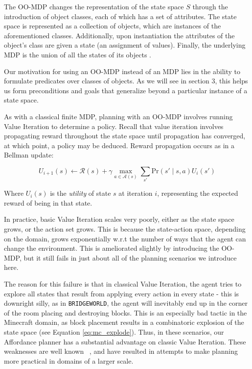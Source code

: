 \documentclass[]{article}
\begin{document}
The OO-MDP changes the representation of the state space 
$S$ through the introduction of object classes, each of which 
has a set of attributes. The state space is represented as a 
collection of objects, which are instances of the aforementioned 
classes. Additionally, upon instantiation the attributes of the 
object's class are given a state (an assignment of values). 
Finally, the underlying MDP is the union of all the states of its 
objects \citep{diuk08}.

Our motivation for using an OO-MDP instead of an MDP
lies in the ability to formulate predicates over classes of 
objects. As we will see in section 3, this helps us form 
preconditions and goals that generalize beyond a particular
instance of a state space.

As with a classical finite MDP, planning with an OO-MDP 
involves running Value Iteration to determine a policy. 
Recall that value iteration involves propagating reward 
throughout the state space until propagation has converged, 
at which point, a policy may be deduced. Reward propagation
occurs as in a Bellman update:

\begin{equation}
U_{i+1}(s) \leftarrow \mathcal{R}(s) + \gamma \max_{a \in \mathcal{A}(s)} \sum_{s'} \text{Pr}(s' \mid s, a)U_i(s')
\end{equation}

Where $U_i(s)$ is the {\it utility} of state $s$ at iteration $i$, 
representing the expected reward of being in that state.

In practice, basic Value Iteration scales very poorly, either as the state 
space grows, or the action set grows. This is because the state-action 
space, depending on the domain, grows exponentially w.r.t the number 
of ways that the agent can change the environment. This is ameliorated 
slightly by introducing the OO-MDP, but it still fails in just about all of 
the planning scenarios we introduce here.

The reason for this failure is that in classical Value Iteration, the agent tries to 
explore all states that result from applying every action in every state - this is downright silly, 
as in \texttt{BRIDGEWORLD}, the agent will inevitably end up in the corner of the 
room placing and destroying blocks. This is an especially bad tactic in the Minecraft 
domain, as block placement results in a combinatoric explosion of the state space 
(see Equation \ref{eq:mc_explode}). Thus, in these scenarios, our Affordance planner 
has a substantial advantage on classic Value Iteration. These weaknesses are well 
known ~\citep{grounds05}, and have resulted in attempts to make planning more 
practical in domains of a larger scale.
\end{document}
